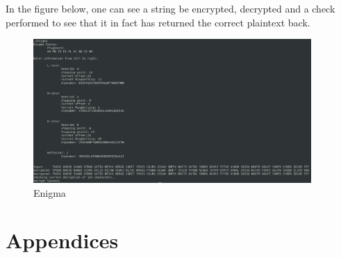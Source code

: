 \documentclass{article}
\begin{document}
In the figure below, one can see a string be encrypted, decrypted and a check performed to see that it in fact has returned the correct plaintext back.
\begin{figure}[H]
 \centering
  \includegraphics[width=300pt]{img/enigmaMan.png}
 \caption{Enigma}
 \end{figure}




\section{Appendices}
\end{document}
